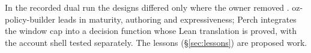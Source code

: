 In the recorded dual run the designs differed only where the owner removed
. oz-policy-builder leads in maturity, authoring and
expressiveness; Perch integrates the window cap into a decision function whose
Lean translation is proved, with the account shell tested separately. The lessons
(\S\ref{sec:lessons}) are proposed work.
